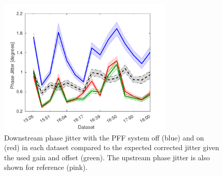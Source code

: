 
\begin{figure}
  \centering
  \includegraphics[width=0.75\textwidth]{Figures/feedforward/longFF_jitDatSet}
  \caption{Downstream phase jitter with the PFF system off (blue) and on (red) in each dataset compared to the expected corrected jitter given the used gain and offset (green). The upstream phase jitter is also shown for reference (pink).}
  \label{f:longFF_jitDatSet}
\end{figure}

